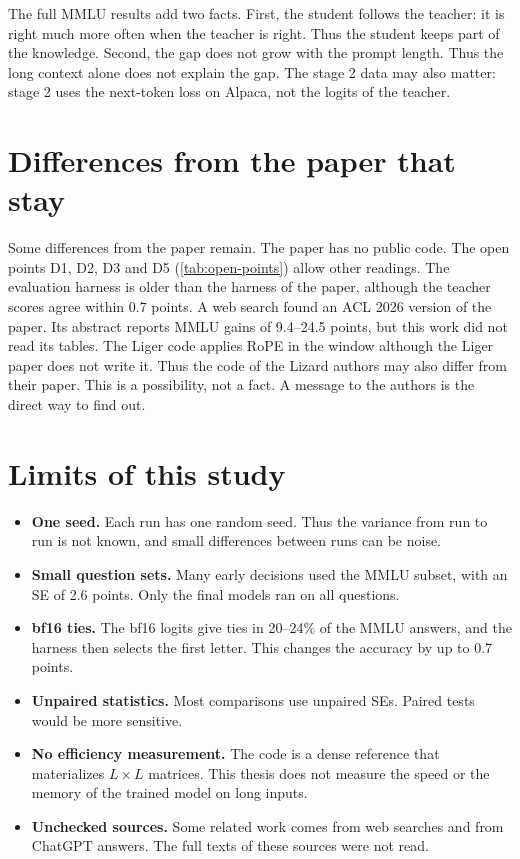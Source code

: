 The full MMLU results add two facts. First, the student follows the teacher: it is right much more often when the teacher is right. Thus the student keeps part of the knowledge. Second, the gap does not grow with the prompt length. Thus the long context alone does not explain the gap. The stage 2 data may also matter: stage 2 uses the next-token loss on Alpaca, not the logits of the teacher.

\section{Differences from the paper that stay}
\label{sec:differences}

Some differences from the paper remain. The paper has no public code. The open points D1, D2, D3 and D5 (\cref{tab:open-points}) allow other readings. The evaluation harness is older than the harness of the paper, although the teacher scores agree within 0.7 points. A web search found an ACL 2026 version of the paper. Its abstract reports MMLU gains of 9.4--24.5 points, but this work did not read its tables. The Liger code applies RoPE in the window although the Liger paper does not write it. Thus the code of the Lizard authors may also differ from their paper. This is a possibility, not a fact. A message to the authors is the direct way to find out.

\section{Limits of this study}
\label{sec:limits}

\begin{itemize}
\item \textbf{One seed.} Each run has one random seed. Thus the variance from run to run is not known, and small differences between runs can be noise.
\item \textbf{Small question sets.} Many early decisions used the MMLU subset, with an SE of 2.6 points. Only the final models ran on all questions.
\item \textbf{bf16 ties.} The bf16 logits give ties in 20--24\% of the MMLU answers, and the harness then selects the first letter. This changes the accuracy by up to 0.7 points.
\item \textbf{Unpaired statistics.} Most comparisons use unpaired SEs. Paired tests would be more sensitive.
\item \textbf{No efficiency measurement.} The code is a dense reference that materializes $L \times L$ matrices. This thesis does not measure the speed or the memory of the trained model on long inputs.
\item \textbf{Unchecked sources.} Some related work comes from web searches and from ChatGPT answers. The full texts of these sources were not read.
\end{itemize}

